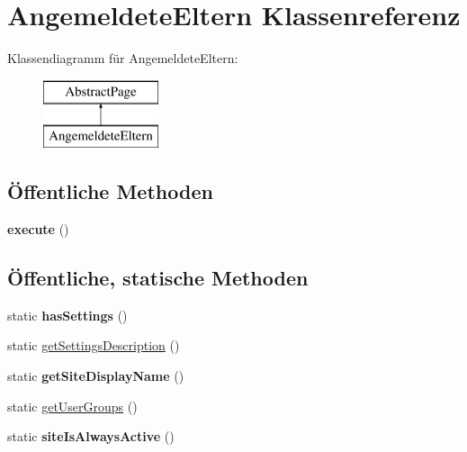 \hypertarget{class_angemeldete_eltern}{}\section{Angemeldete\+Eltern Klassenreferenz}
\label{class_angemeldete_eltern}
Klassendiagramm für Angemeldete\+Eltern\+:\begin{figure}[H]
\begin{center}
\leavevmode
\includegraphics[height=2.000000cm]{class_angemeldete_eltern}
\end{center}
\end{figure}
\subsection*{Öffentliche Methoden}
\begin{DoxyCompactItemize}
\item 
\mbox{\label{class_angemeldete_eltern_aa602952083ef1d9a86c38e9e839c17b8}} 
{\bfseries execute} ()
\end{DoxyCompactItemize}
\subsection*{Öffentliche, statische Methoden}
\begin{DoxyCompactItemize}
\item 
\mbox{\label{class_angemeldete_eltern_a8f44f9e9abf999aa07622ce736804bef}} 
static {\bfseries has\+Settings} ()
\item 
static \mbox{\hyperlink{class_angemeldete_eltern_a96b258e5e03fe9a853da189bd40934c8}{get\+Settings\+Description}} ()
\item 
\mbox{\label{class_angemeldete_eltern_a8eb2c8eb42a1d09308773c432d295eeb}} 
static {\bfseries get\+Site\+Display\+Name} ()
\item 
static \mbox{\hyperlink{class_angemeldete_eltern_a1d7d4c5050358db70a5bf45906f33fc8}{get\+User\+Groups}} ()
\item 
\mbox{\label{class_angemeldete_eltern_aafc533f4eaacd5d2805897a98ad50534}} 
static {\bfseries site\+Is\+Always\+Active} ()
\end{DoxyCompactItemize}
